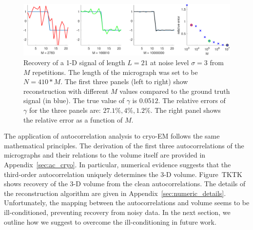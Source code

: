 \documentclass[9pt,twocolumn,twoside,lineno]{pnas-new}
\begin{document}
%



\begin{figure}[h!]
	\centering
	\includegraphics[scale=0.7]{1D_example}
	\caption{\label{fig:1D_example} Recovery of a 1-D signal of length $L=21$ at noise level $\sigma = 3$ from $M$ repetitions. The length of the micrograph was set to be $N = 410*M$. The first three panels (left to right) show reconstruction with different $M$ values compared to the ground truth signal (in blue).
		The true value of $\gamma$ is $0.0512$.
		   The relative errors of $\gamma$ for the three panels are: $27.1\%,4\%,1.2\%$. The right panel shows the relative error as a function of $M$.
	}
\end{figure}

The application of autocorrelation analysis to cryo-EM follows the same mathematical principles.
The derivation of the first three autocorrelations of the micrographs and their relations to the volume itself are provided in Appendix~\ref{sec:ac_cryo}.
In particular, numerical evidence suggests that the third-order autocorrelation uniquely determines the 3-D volume. Figure~TKTK shows recovery of the 3-D volume from the clean autocorrelations. The details of the reconstruction algorithm are given in Appendix~\ref{sec:numeric_details}.
Unfortunately, the mapping between the autocorrelations and volume seems to be ill-conditioned, preventing recovery from noisy data. 
In the next section, we outline how we suggest to overcome the ill-conditioning in future work. 
\end{document}
